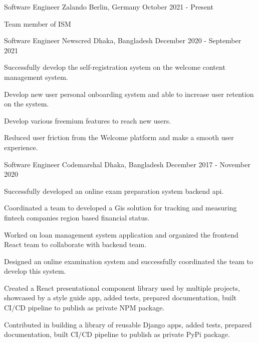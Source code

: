 \begin{cventries}

\cventry
    {Software Engineer}
    {Zalando}
    {Berlin, Germany}
    {October 2021 - Present}
    {
      \begin{cvitemsNumber}[Responsibilities:]
        \item {Team member of ISM}
      \end{cvitemsNumber}
    }

\cventry
    {Software Engineer}
    {Newscred}
    {Dhaka, Bangladesh}
    {December 2020 - September 2021}
    {
      \begin{cvitemsNumber}[Responsibilities:]
        \item {Successfully develop the self-registration system on the welcome content management system.}
        \vspace{1mm}
        \item {Develop new user personal onboarding system and able to increase user retention on the system.}
        \vspace{1mm}
        \item{Develop various freemium features to reach new users.}
        \vspace{1mm}
        \item{Reduced user friction from the Welcome platform and make a smooth user experience.}
      \end{cvitemsNumber}
    }

\cventry
    {Software Engineer}
    {Codemarshal}
    {Dhaka, Bangladesh}
    {December 2017 - November 2020}
    {
      \begin{cvitemsNumber}[Responsibilities:]
        \item {Successfully developed an online exam preparation system backend api.}
        \vspace{1mm}
        \item {Coordinated a team to developed a Gis solution for tracking and measuring fintech companies region based financial status.}
        \vspace{1mm}
        \item {Worked on loan management system application and organized the frontend React team to collaborate with backend team.}
        \vspace{1mm}
        \item {Designed an online examination system and successfully coordinated the team to develop this system.}
        \vspace{1mm}
        \item {Created a React presentational component library used by multiple projects, showcased by a style guide app, added tests, prepared documentation, built CI/CD pipeline to publish as private NPM package.}
        \vspace{1mm}
        \item {Contributed in building a library of reusable Django apps, added tests, prepared documentation, built CI/CD pipeline to publish as private PyPi package.}
        \vspace{1mm}
      \end{cvitemsNumber}
    }


\end{cventries}
